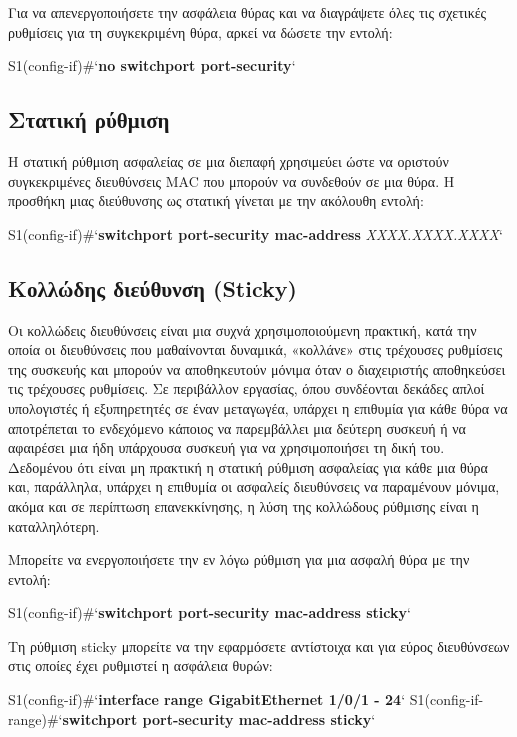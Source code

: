 \documentclass{EdipyLabs} %
\begin{document}
Για να απενεργοποιήσετε την ασφάλεια θύρας και να διαγράψετε όλες τις σχετικές ρυθμίσεις για τη συγκεκριμένη θύρα, αρκεί να δώσετε την εντολή:

\begin{CommandBox}
S1(config-if)#`\textbf{no switchport port-security}`
\end{CommandBox}

\subsection{Στατική ρύθμιση}
Η στατική ρύθμιση ασφαλείας σε μια διεπαφή χρησιμεύει ώστε να οριστούν συγκεκριμένες διευθύνσεις MAC που μπορούν να συνδεθούν σε μια θύρα. Η προσθήκη μιας διεύθυνσης ως στατική γίνεται με την ακόλουθη εντολή:

\begin{CommandBox}
S1(config-if)#`\textbf{switchport port-security mac-address} \textit{XXXX.XXXX.XXXX}`
\end{CommandBox}

\subsection{Κολλώδης διεύθυνση (Sticky)}
Οι κολλώδεις διευθύνσεις είναι μια συχνά χρησιμοποιούμενη πρακτική, κατά την οποία οι διευθύνσεις που μαθαίνονται δυναμικά, «κολλάνε» στις τρέχουσες ρυθμίσεις της συσκευής και μπορούν να αποθηκευτούν μόνιμα όταν ο διαχειριστής αποθηκεύσει τις τρέχουσες ρυθμίσεις. Σε περιβάλλον εργασίας, όπου συνδέονται δεκάδες απλοί υπολογιστές ή εξυπηρετητές σε έναν μεταγωγέα, υπάρχει η επιθυμία για κάθε θύρα να αποτρέπεται το ενδεχόμενο κάποιος να παρεμβάλλει μια δεύτερη συσκευή ή να αφαιρέσει μια ήδη υπάρχουσα συσκευή για να χρησιμοποιήσει τη δική του. Δεδομένου ότι είναι μη πρακτική η στατική ρύθμιση ασφαλείας για κάθε μια θύρα και, παράλληλα, υπάρχει η επιθυμία οι ασφαλείς διευθύνσεις να παραμένουν μόνιμα, ακόμα και σε περίπτωση επανεκκίνησης, η λύση της κολλώδους ρύθμισης είναι η καταλληλότερη.

Μπορείτε να ενεργοποιήσετε την εν λόγω ρύθμιση για μια ασφαλή θύρα με την εντολή:

\begin{CommandBox}
S1(config-if)#`\textbf{switchport port-security mac-address sticky}`
\end{CommandBox}

Τη ρύθμιση sticky μπορείτε να την εφαρμόσετε αντίστοιχα και για εύρος διευθύνσεων στις οποίες έχει ρυθμιστεί η ασφάλεια θυρών:
\begin{CommandBox}
S1(config-if)#`\textbf{interface range GigabitEthernet 1/0/1 - 24}`
S1(config-if-range)#`\textbf{switchport port-security mac-address sticky}`
\end{CommandBox}
\end{document}
